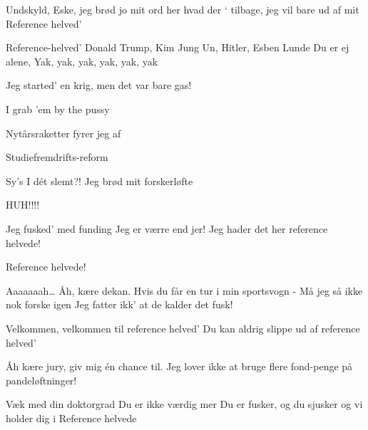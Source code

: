 \documentclass[a4paper,11pt]{article}
\begin{document}
\begin{song}
Undskyld, Eske, jeg brød jo mit ord
her hvad der ‘ tilbage, jeg
vil bare ud af mit
Reference helved’

Reference-helved’
Donald Trump, Kim Jung Un,
Hitler, Esben Lunde
Du er ej alene,
Yak, yak, yak, yak, yak, yak
 
Jeg started’ en krig, men det var bare gas!
 
I grab ’em by the pussy
 
Nytårsraketter fyrer jeg 
af 

Studiefremdrifts-reform
 
Sy’s I dét slemt?!
Jeg brød mit forskerløfte
 
  HUH!!!!
 
Jeg fusked’ med funding
Jeg er værre end jer!
Jeg hader det her reference helvede!
 
Reference helvede!
 
Aaaaaaah\ldots
Åh, kære dekan. Hvis du får en tur i min sportsvogn - 
Må jeg så ikke nok forske igen
Jeg fatter ikk’ at de kalder det fusk!
 
 
Velkommen, velkommen
til reference helved’
Du kan aldrig slippe ud
af reference helved’
 
Åh kære jury, giv mig én chance til. 
Jeg lover ikke at bruge flere fond-penge på pandeløftninger!
 

Væk med din doktorgrad
Du er ikke værdig mer
Du er fusker, og du sjusker
og vi holder dig i
Reference helvede


\end{song}
\end{document}
